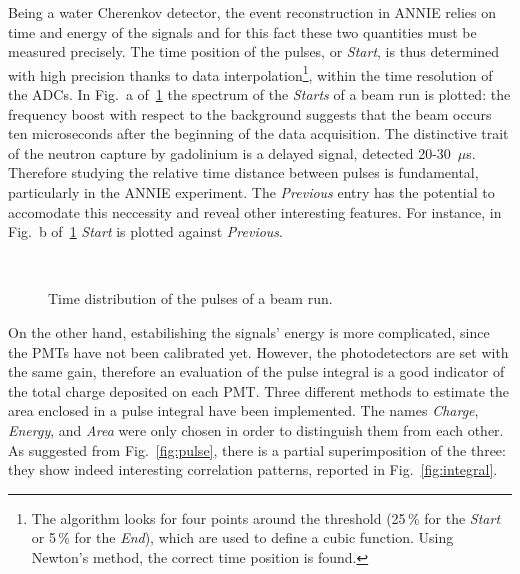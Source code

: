  Being a water Cherenkov detector, the event reconstruction in ANNIE relies on time and energy of the signals %
 and for this fact these two quantities must be measured precisely.
 The time position of the pulses, or \emph{Start}, is thus determined with high precision thanks to data %
 interpolation\footnote{The algorithm looks for four points around the threshold (25\,\% for the \emph{Start} %
   or 5\,\% for the \emph{End}), which are used to define a cubic function. Using Newton's method, the correct %
   time position is found.}, within the time resolution of the ADCs.
 In Fig.~a of~\ref{fig:spectrum} the spectrum of the \emph{Starts} of a beam run is plotted: the frequency boost %
 with respect to the background suggests that the beam occurs ten microseconds after the beginning of the data %
 acquisition.
 The distinctive trait of the neutron capture by gadolinium is a delayed signal, detected 20-30~$\mu$s.
 Therefore studying the relative time distance between pulses is fundamental, particularly in the ANNIE experiment.
 The \emph{Previous} entry has the potential to accomodate this neccessity and reveal other interesting features.
 For instance, in Fig.~b of~\ref{fig:spectrum} \emph{Start} is plotted against \emph{Previous}.

 \begin{figure}
   \centering
   \,
  \caption{Time distribution of the pulses of a beam run.}
   \label{fig:spectrum}
 \end{figure}

 On the other hand, estabilishing the signals' energy is more complicated, since the PMTs have not been calibrated yet.
 However, the photodetectors are set with the same gain, therefore an evaluation of the pulse integral is a good %
 indicator of the total charge deposited on each PMT.
 Three different methods to estimate the area enclosed in a pulse integral have been implemented.
 The names \emph{Charge}, \emph{Energy}, and \emph{Area} were only chosen in order to distinguish them from each other.
 As suggested from Fig.~\ref{fig:pulse}, there is a partial superimposition of the three: they show indeed %
 interesting correlation patterns, reported in Fig.~\ref{fig:integral}.

